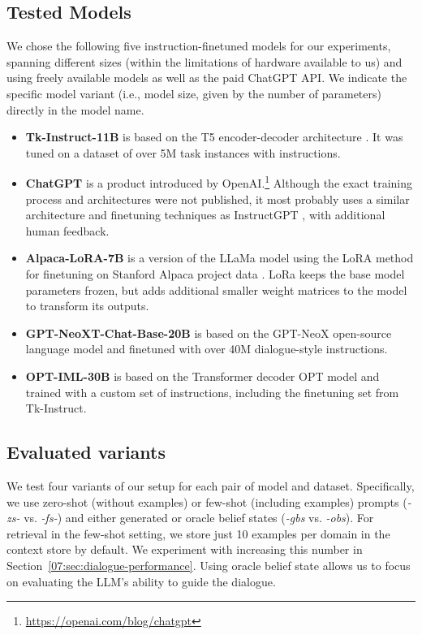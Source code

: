 \subsection{Tested Models}
We chose the following five instruction-finetuned models for our experiments, spanning different sizes (within the limitations of hardware available to us) and using freely available models as well as the paid ChatGPT API.
We indicate the specific model variant (i.e., model size, given by the number of parameters) directly in the model name.
\label{07:sec:par:models}
\begin{itemize}
    \item \textbf{Tk-Instruct-11B} \cite{supernaturalinstructions} is based on the T5 encoder-decoder architecture \cite{2020t5}. It was tuned on a dataset of over 5M task instances with instructions.
    \item \textbf{ChatGPT} is a product introduced by OpenAI.\footnote{\url{https://openai.com/blog/chatgpt}} Although the exact training process and architectures were not published, it most probably uses a similar architecture and finetuning techniques as InstructGPT \cite{ouyang2022training}, with additional human feedback.
    \item \textbf{Alpaca-LoRA-7B} is a version of the LLaMa model \cite{touvron2023llama} using the LoRA method \cite{hu2021lora} for finetuning on Stanford Alpaca project data \cite{alpaca}. LoRa keeps the base model parameters frozen, but adds additional smaller weight matrices to the model to transform its outputs.
    \item \textbf{GPT-NeoXT-Chat-Base-20B} is based on the GPT-NeoX open-source language model \cite{black2022gpt} and finetuned with over 40M dialogue-style instructions.
    \item \textbf{OPT-IML-30B} \cite{iyer2022opt} is based on the Transformer decoder OPT model \cite{zhang2022opt} and trained with a custom set of instructions, including the finetuning set from Tk-Instruct.
\end{itemize}

\subsection{Evaluated variants}
We test four variants of our setup for each pair of model and dataset.
Specifically, we use zero-shot (without examples) or few-shot (including examples) prompts (\emph{-zs-} vs. \emph{-fs-}) and either generated or oracle belief states (\emph{-gbs} vs. \emph{-obs}).
For retrieval in the few-shot setting, we store just 10 examples per domain in the context store by default. We experiment with increasing this number in Section~\ref{07:sec:dialogue-performance}.
Using oracle belief state allows us to focus on evaluating the LLM's ability to guide the dialogue.

